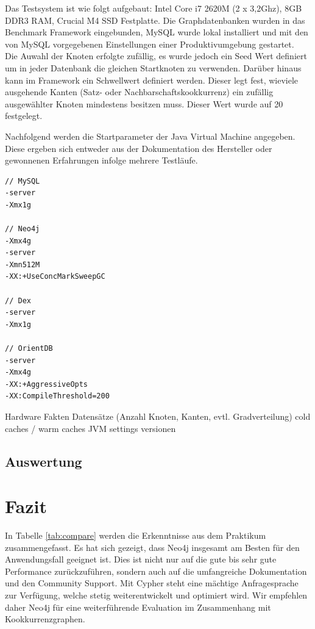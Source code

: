 \documentclass[11pt, a4paper, oneside]{article} %
\begin{document}
Das Testsystem ist wie folgt aufgebaut: Intel Core i7 2620M (2 x 3,2Ghz), 8GB DDR3 RAM, Crucial M4 SSD Festplatte. Die Graphdatenbanken wurden in das Benchmark Framework eingebunden, MySQL wurde lokal installiert und mit den von MySQL vorgegebenen Einstellungen einer Produktivumgebung gestartet.\\
Die Auwahl der Knoten erfolgte zufällig, es wurde jedoch ein Seed Wert definiert um in jeder Datenbank die gleichen Startknoten zu verwenden. Darüber hinaus kann im Framework ein Schwellwert definiert werden. Dieser legt fest, wieviele ausgehende Kanten (Satz- oder Nachbarschaftskookkurrenz) ein zufällig ausgewählter Knoten mindestens besitzen muss. Dieser Wert wurde auf 20 festgelegt.
\par
Nachfolgend werden die Startparameter der Java Virtual Machine angegeben. Diese ergeben sich entweder aus der Dokumentation des Hersteller oder gewonnenen Erfahrungen infolge mehrere Testläufe.

\begin{lstlisting}
// MySQL
-server
-Xmx1g

// Neo4j
-Xmx4g
-server
-Xmn512M
-XX:+UseConcMarkSweepGC

// Dex
-server
-Xmx1g

// OrientDB
-server
-Xmx4g
-XX:+AggressiveOpts 
-XX:CompileThreshold=200
\end{lstlisting}


Hardware Fakten
Datensätze (Anzahl Knoten, Kanten, evtl. Gradverteilung)
cold caches / warm caches
JVM settings
versionen

\subsection{Auswertung}

\section{Fazit}

In Tabelle \ref{tab:compare} werden die Erkenntnisse aus dem Praktikum zusammengefasst. Es hat sich gezeigt, dass Neo4j insgesamt am Besten für den Anwendungsfall geeignet ist. Dies ist nicht nur auf die gute bis sehr gute Performance zurückzuführen, sondern auch auf die umfangreiche Dokumentation und den Community Support. Mit Cypher steht eine mächtige Anfragesprache zur Verfügung, welche stetig weiterentwickelt und optimiert wird. Wir empfehlen daher Neo4j für eine weiterführende Evaluation im Zusammenhang mit Kookkurrenzgraphen.
\end{document}
